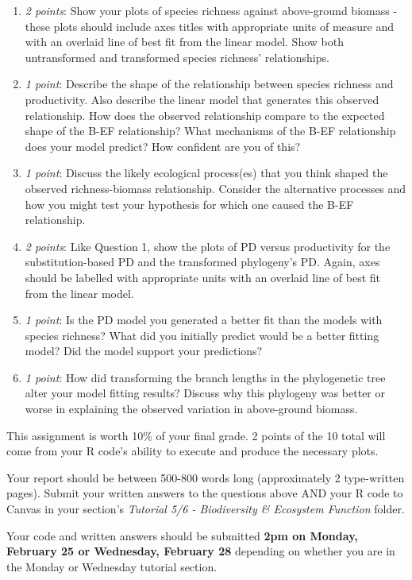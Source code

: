 \documentclass[]{article}
\begin{document}
\begin{enumerate}
\def\labelenumi{\arabic{enumi}.}
\item
  \emph{2 points}: Show your plots of species richness against
  above-ground biomass - these plots should include axes titles with
  appropriate units of measure and with an overlaid line of best fit
  from the linear model. Show both untransformed and transformed species
  richness' relationships.
\item
  \emph{1 point}: Describe the shape of the relationship between species
  richness and productivity. Also describe the linear model that
  generates this observed relationship. How does the observed
  relationship compare to the expected shape of the B-EF relationship?
  What mechanisms of the B-EF relationship does your model predict? How
  confident are you of this?
\item
  \emph{1 point}: Discuss the likely ecological process(es) that you
  think shaped the observed richness-biomass relationship. Consider the
  alternative processes and how you might test your hypothesis for which
  one caused the B-EF relationship.
\item
  \emph{2 points}: Like Question 1, show the plots of PD versus
  productivity for the substitution-based PD and the transformed
  phylogeny's PD. Again, axes should be labelled with appropriate units
  with an overlaid line of best fit from the linear model.
\item
  \emph{1 point}: Is the PD model you generated a better fit than the
  models with species richness? What did you initially predict would be
  a better fitting model? Did the model support your predictions?
\item
  \emph{1 point}: How did transforming the branch lengths in the
  phylogenetic tree alter your model fitting results? Discuss why this
  phylogeny was better or worse in explaining the observed variation in
  above-ground biomass.
\end{enumerate}

This assignment is worth 10\% of your final grade. 2 points of the 10
total will come from your R code's ability to execute and produce the
necessary plots.

Your report should be between 500-800 words long (approximately 2
type-written pages). Submit your written answers to the questions above
AND your R code to Canvas in your section's \emph{Tutorial 5/6 -
Biodiversity \& Ecosystem Function} folder.

Your code and written answers should be submitted \textbf{2pm on Monday,
February 25 or Wednesday, February 28} depending on whether you are in
the Monday or Wednesday tutorial section.
\end{document}

